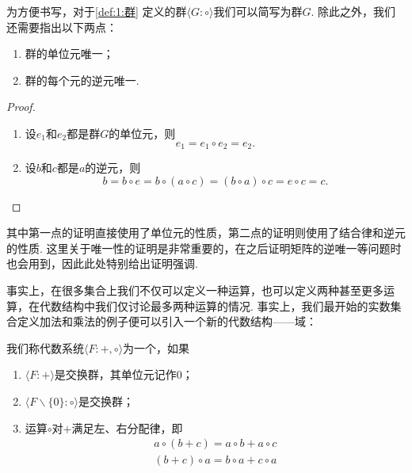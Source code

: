 为方便书写，对于\autoref{def:1:群} 定义的群$\langle G:\circ\rangle$我们可以简写为群$G$. 除此之外，我们还需要指出以下两点：
\begin{theorem}
    \begin{enumerate}
        \item 群的单位元唯一；

        \item 群的每个元的逆元唯一.
    \end{enumerate}
\end{theorem}

\begin{proof}
    \begin{enumerate}
        \item 设$e_1$和$e_2$都是群$G$的单位元，则
              \[e_1=e_1\circ e_2=e_2.\]

        \item 设$b$和$c$都是$a$的逆元，则
              \[b=b\circ e=b\circ(a\circ c)=(b\circ a)\circ c=e\circ c=c.\]
    \end{enumerate}
\end{proof}

其中第一点的证明直接使用了单位元的性质，第二点的证明则使用了结合律和逆元的性质. 这里关于唯一性的证明是非常重要的，在之后证明矩阵的逆唯一等问题时也会用到，因此此处特别给出证明强调.

事实上，在很多集合上我们不仅可以定义一种运算，也可以定义两种甚至更多运算，在代数结构中我们仅讨论最多两种运算的情况. 事实上，我们最开始的实数集合定义加法和乘法的例子便可以引入一个新的代数结构——域：
\begin{definition}[{\keyterm{域}[field]}]
    我们称代数系统$\langle F:+,\circ\rangle$为一个，如果
    \begin{enumerate}
        \item $\langle F:+\rangle$是交换群，其单位元记作0；

        \item $\langle F\backslash\{0\}:\circ\rangle$是交换群；

        \item 运算$\circ$对$+$满足左、右分配律，即
              \begin{gather*}
                  a\circ(b+c)=a\circ b+a\circ c \\
                  (b+c)\circ a=b\circ a+c\circ a
              \end{gather*}
    \end{enumerate}
\end{definition}

